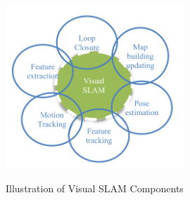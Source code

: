 \begin{figure}[H]
  \centering
  \includegraphics[width=0.6\textwidth]{Figures/Visual SLAM Components.PNG}
  \caption[Illustration of Visual SLAM Components]{Illustration of Visual SLAM Components} \cite{Taheri2021}
  \label{fig:Visual SLAM Components}
\end{figure}


